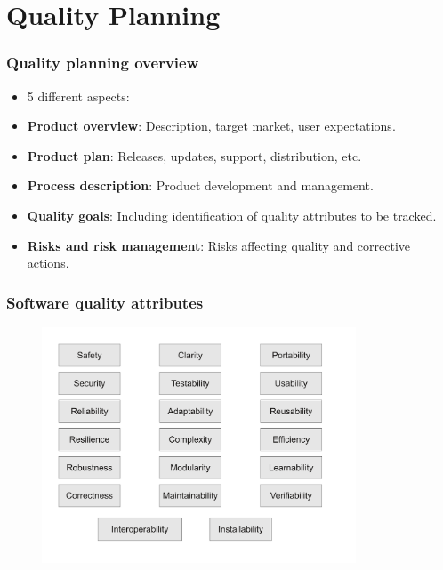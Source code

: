 \documentclass{beamer}
\begin{document}

\section{Quality Planning}


\begin{frame}
 \frametitle{Quality planning overview}
 \begin{itemize}
 \item 5 different aspects:
 \item \textbf{Product overview}: Description, target market, user expectations.
 \item \textbf{Product plan}: Releases, updates, support, distribution, etc.
 \item \textbf{Process description}: Product development and management.
 \item \textbf{Quality goals}: Including identification of quality attributes to be tracked.
 \item \textbf{Risks and risk management}: Risks affecting quality and corrective actions.
 \end{itemize}
\end{frame}


\begin{frame}
\frametitle{Software quality attributes}
\begin{center}
\begin{figure}
 \includegraphics[height=7cm]{figs/quality-attributes.pdf}
\end{figure}
\end{center}
\end{frame}
\end{document}
